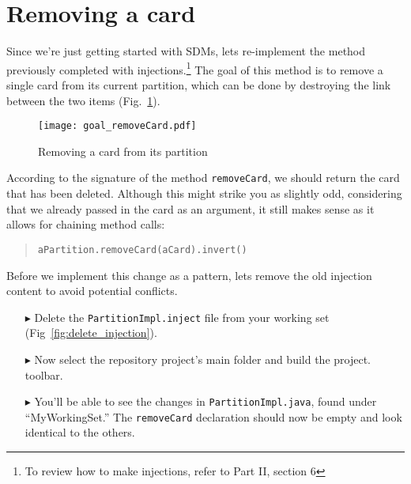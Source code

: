 \newpage
\genHeader
\section{Removing a card}
\hypertarget{sec:remCard}{}

Since we're just getting started with SDMs, lets re-implement the method previously completed with injections.\footnote{To review how to make
injections, refer to Part II, section 6} The goal of this method is to remove a single card from its current partition, which can be done by destroying the link
between the two items (Fig.~\ref{fig:goal_removeCard}).

\vspace{0.5cm}

\begin{figure}[htbp]
	\centering
    \texttt{[image: goal\_removeCard.pdf]}
	\caption{Removing a card from its partition}
	\label{fig:goal_removeCard}
\end{figure}
\FloatBarrier

\vspace{0.5cm}

According to the signature of the method \texttt{removeCard}, we should return the card that has been deleted. Although this might strike you as slightly odd,
considering that we already passed in the card as an argument, it still makes sense as it allows for chaining method calls:
\begin{quote}\texttt{aPartition.removeCard(aCard).invert()}\end{quote}

Before we implement this change as a pattern, lets remove the old injection content to avoid potential conflicts.

\begin{itemize}

\item[$\blacktriangleright$] Delete the \texttt{PartitionImpl.inject} file from your working set (Fig~\ref{fig:delete_injection}).

\item[$\blacktriangleright$] Now select the repository project's main folder and build the project.
toolbar.

\item[$\blacktriangleright$] You'll be able to see the changes in \texttt{PartitionImpl.java}, found under ``MyWorkingSet.'' The \texttt{removeCard}
declaration should now be empty and look identical to the others.

\end{itemize}

